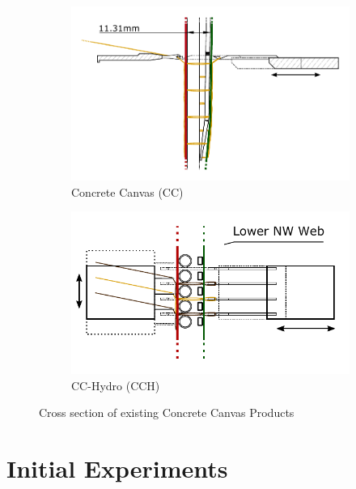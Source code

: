 \documentclass[12pt]{report}
\begin{document}
\begin{figure}[ht]
    \begin{subfigure}{\textwidth}
        \centering
        \includegraphics[width=\linewidth]{figures/background/stitch_side.pdf}  
        \caption{Concrete Canvas (CC)}
        \label{fig:sub-first}
    \end{subfigure}
    \newline
    \begin{subfigure}{\textwidth}
        \centering
        \includegraphics[width=\linewidth]{figures/background/stitch_top.pdf}  
        \caption{CC-Hydro (CCH)}
        \label{fig:sub-second}
    \end{subfigure}
    \caption{Cross section of existing Concrete Canvas Products}
    \label{fig:fig}
\end{figure}
        
\chapter{Initial Experiments}
\end{document}

